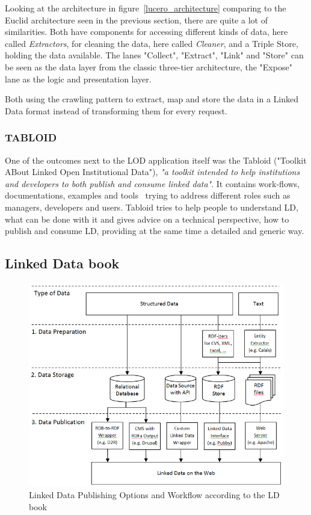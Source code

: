 Looking at the architecture in figure~\ref{lucero_architecture} comparing to the Euclid architecture seen in the previous section, there are quite a lot of similarities. Both have components for accessing different kinds of data, here called \emph{Extractors}, for cleaning the data, here called \emph{Cleaner}, and a Triple Store, holding the data available. The lanes "Collect", "Extract", "Link" and "Store" can be seen as the data layer from the classic three-tier architecture, the "Expose" lane as the logic and presentation layer. 

Both using the crawling pattern to extract, map and store the data in a Linked Data format instead of transforming them for every request.

\subsubsection{TABLOID}
One of the outcomes next to the LOD application itself was the Tabloid ("Toolkit ABout Linked Open Institutional Data"), \emph{"a toolkit intended to help institutions and developers to both publish and consume linked data"}. It contains work-flows, documentations, examples and tools~\cite{lucero:tabloid} trying to address different roles such as managers, developers and users. Tabloid tries to help people to understand LD, what can be done with it and gives advice on a technical perspective, how to publish and consume LD, providing at the same time a detailed and generic way.

\subsection{Linked Data book}

\begin{figure}[htbp]
	\centering
\includegraphics[width=\textwidth]{img/ld_architecture.png}
	\caption{Linked Data Publishing Options and Workflow according to the LD book}
	\label{ld_architecture}
\end{figure}

